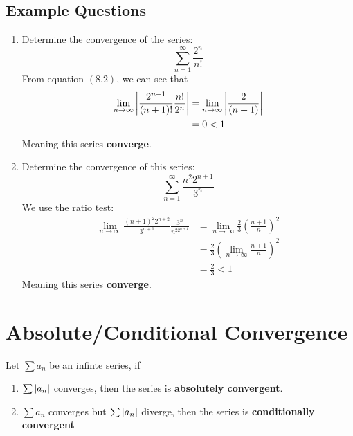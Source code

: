 \documentclass{article}
\numberwithin{equation}{section}
\begin{document}
\subsection{Example Questions}
\begin{enumerate}
    \item Determine the convergence of the series:
    \[
        \sum_{n = 1}^{\infty} \frac{2^n}{n!}
    \]
    From equation $(8.2)$, we can see that
    \[
        \begin{split}
            \lim_{n\to \infty} \abs{\frac{2^{n+1}}{(n+1)!} \frac{n!}{2^n}} &= \lim_{n\to \infty} \abs{\frac{2}{(n+1)}}\\
            & = 0 < 1
        \end{split}
    \]
    Meaning this series \textbf{converge}.
    \item Determine the convergence of this series:
    \[
        \sum_{n = 1}^{\infty} \frac{n^2 2^{n+1}}{3^n}
    \]
    We use the ratio test:
    \[
        \begin{split}
            \lim_{n\to \infty} \frac{(n+1)^2 2^{n+2}}{3^{n+1}} \frac{3^n}{n^22^{n+1}} & = \lim_{n\to \infty} \frac{2}{3} \left(\frac{n+1}{n}\right)^2\\
            & = \frac{2}{3} \left(\lim_{n\to\infty} \frac{n+1}{n}\right)^2\\
            & = \frac{2}{3} < 1
        \end{split}
    \]
    Meaning this series \textbf{converge}.
\end{enumerate}

\newpage
\section{Absolute/Conditional Convergence}
Let $\sum a_n$ be an infinte series, if 
\begin{enumerate}
    \item $\sum \abs{a_n}$ converges, then the series is \textbf{absolutely convergent}.
    \item $\sum a_n$ converges but $\sum \abs{a_n}$ diverge, then the series is \textbf{conditionally convergent}
\end{enumerate}
\end{document}
